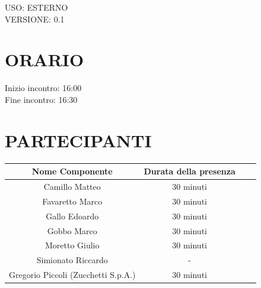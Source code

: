 \documentclass[5pt]{article}
\begin{document}
\begin{flushright}
    \begin{spacing}{1}
        USO: ESTERNO\\
        VERSIONE: 0.1\\
    \end{spacing}
\end{flushright}


\restoregeometry

\pagebreak


\section{ORARIO}
\begin{spacing}{1.5}
    {\large Inizio incontro: 16:00}\\
    {\large Fine incontro: 16:30} 
\end{spacing}

\section{PARTECIPANTI}
\setlength\cellspacetoplimit{6pt}
\setlength\cellspacebottomlimit{6pt}

\begin{table}[ht]
  \begin{tabular}{|Sc|Sc|}
    \hline
    \textbf{Nome Componente} & \textbf{Durata della presenza} \\
    \hline
    Camillo Matteo & 30 minuti \\
    Favaretto Marco & 30 minuti \\
    Gallo Edoardo & 30 minuti \\
    Gobbo Marco & 30 minuti \\
    Moretto Giulio & 30 minuti \\
    Simionato Riccardo & - \\
    Gregorio Piccoli (Zucchetti S.p.A.) & 30 minuti \\
    \hline
  \end{tabular}
  \label{tab:conference}
\end{table}
\end{document}
